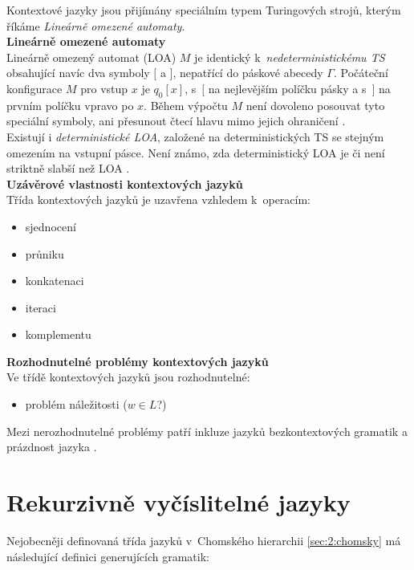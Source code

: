 Kontextové jazyky jsou přijímány speciálním typem Turingových strojů, kterým říkáme \textit{Lineárně omezené automaty}. \\

\textbf{Lineárně omezené automaty} \\
Lineárně omezený automat (LOA) $M$ je identický k~\textit{nedeterministickému TS} obsahující navíc dva symboly $[$ a $]$, nepatřící do páskové abecedy $\Gamma$.
Počáteční konfigurace $M$ pro vstup $x$ je $q_0[x]$, s~$[$ na nejlevějším políčku pásky a s~$]$ na prvním políčku vpravo po $x$.
Během výpočtu $M$ není dovoleno posouvat tyto speciální symboly, ani přesunout čtecí hlavu mimo jejich ohraničení \cite[str. 278 - 279]{Martin2011}. \\

Existují i \textit{deterministické LOA}, založené na deterministických TS se stejným omezením na vstupní pásce.
Není známo, zda deterministický LOA je či není striktně slabší než LOA \cite[str. 121]{TIN2013}. \\

\textbf{Uzávěrové vlastnosti kontextových jazyků} \\
Třída kontextových jazyků je uzavřena vzhledem k~operacím:
\begin{itemize}
\item sjednocení
\item průniku
\item konkatenaci
\item iteraci
\item komplementu \cite[str. 122]{TIN2013}
\end{itemize}
\vspace*{\baselineskip}

\textbf{Rozhodnutelné problémy kontextových jazyků} \\
Ve třídě kontextových jazyků jsou rozhodnutelné:
\begin{itemize}
\item problém náležitosti ($w \in L$?) \cite[str. 122]{TIN2013}
\end{itemize}
\vspace*{\baselineskip}
Mezi nerozhodnutelné problémy patří inkluze jazyků bezkontextových gramatik a prázdnost jazyka \cite[str. 123]{TIN2013}.

\section{Rekurzivně vyčíslitelné jazyky} \label{sec:2:rek}
Nejobecněji definovaná třída jazyků v~Chomského hierarchii \ref{sec:2:chomsky} má následující definici generujících gramatik: \\

